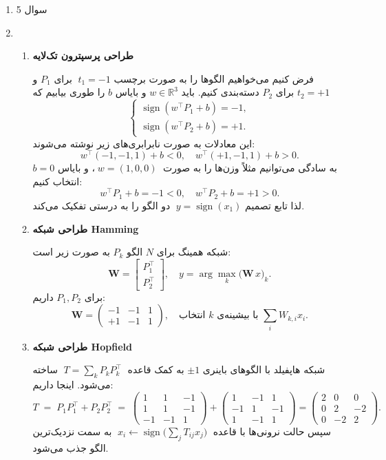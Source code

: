 \begin{enumerate}
	\item  سوال 5
	


	\item 
	
	\begin{enumerate}
		\item {\bf طراحی پرسپترون تک‌لایه}
		
		فرض کنیم می‌خواهیم الگوها را به صورت برچسب
		\(\;t_1=-1\) برای \(P_1\) و \(t_2=+1\) برای \(P_2\) دسته‌بندی کنیم.
		باید \(w\in\mathbb{R}^3\) و بایاس \(b\) را طوری بیابیم که
		\[
		\begin{cases}
			\operatorname{sign}(w^\top P_1 + b) = -1,\\
			\operatorname{sign}(w^\top P_2 + b) = +1.
		\end{cases}
		\]
		این معادلات به صورت نابرابری‌های زیر نوشته می‌شوند:
		\[
		w^\top\!(-1,-1,1) + b < 0,
		\quad
		w^\top\!(+1,-1,1) + b > 0.
		\]
		به سادگی می‌توانیم مثلاً وزن‌ها را به صورت
		\(\;w = (1,0,0)\;\)، و بایاس \(b=0\) انتخاب کنیم:
		\[
		w^\top P_1 + b = -1 < 0,\quad
		w^\top P_2 + b = +1 > 0.
		\]
		لذا تابع تصمیم
		\(\;y = \operatorname{sign}(x_1)\)
		دو الگو را به درستی تفکیک می‌کند.
		
		\item {\bf طراحی شبکه Hamming}
		
		شبکه همینگ برای \(N\) الگو \(P_k\) به صورت زیر است:
		\[
		\textbf{W} = 
		\begin{bmatrix}
			P_1^\top \\ P_2^\top
		\end{bmatrix}, 
		\quad
		y = \arg\max_{k}\bigl(\textbf{W}\,x\bigr)_k.
		\]
		برای \(P_1,P_2\) داریم:
		\[
		\textbf{W} =
		\begin{pmatrix}
			-1 & -1 & 1\\
			+1 & -1 & 1
		\end{pmatrix},
		\quad
		\text{انتخاب \(k\) با بیشینه‌ی \(\sum_i W_{k,i}x_i\).}
		\]
		
		\item {\bf طراحی شبکه Hopfield}
		
		شبکه هاپفیلد با الگوهای باینری \(\pm1\) به کمک قاعده
		\(\;T = \sum_k P_k P_k^\top\;\) ساخته می‌شود. اینجا داریم:
		\[
		T \;=\; P_1P_1^\top + P_2P_2^\top
		\;=\;
		\begin{pmatrix}
			1 & 1 & -1\\
			1 & 1 & -1\\
			-1 & -1 & 1
		\end{pmatrix}
		+
		\begin{pmatrix}
			1 & -1 & 1\\
			-1 & 1 & -1\\
			1 & -1 & 1
		\end{pmatrix}
		=
		\begin{pmatrix}
			2 & 0 & 0\\
			0 & 2 & -2\\
			0 & -2 & 2
		\end{pmatrix}.
		\]
		سپس حالت نرونی‌ها با قاعده
		\(\;x_i \leftarrow \operatorname{sign}\bigl(\sum_j T_{ij}x_j\bigr)\;\)
		به سمت نزدیک‌ترین الگو جذب می‌شود.
		

\end{enumerate}
\end{enumerate}
